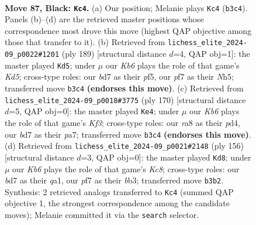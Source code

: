 \documentclass[11pt]{article}
\begin{document}
\clearpage

\begin{figure}[p]\centering
\begin{subfigure}{0.46\textwidth}\centering
\resizebox{\linewidth}{!}{%
\newchessgame
\chessboard[
  setfen={R7/3B1P2/8/7P/8/1k6/8/7K b - - 6 87},
  showmover=false,
  pgfstyle=straightmove, color=movearrow, markmove={b3-c4}
]}
\caption{}
\end{subfigure}\hfill
\begin{subfigure}{0.46\textwidth}\centering
\resizebox{\linewidth}{!}{%
\newchessgame
\chessboard[
  setfen={4R3/8/8/K4P1n/3k4/8/8/8 b - - 0 95},
  showmover=false,
  pgfstyle=straightmove, color=movearrow, markmove={d4-d5}
]}
\caption{}
\end{subfigure}
\\[4pt]
\begin{subfigure}{0.46\textwidth}\centering
\resizebox{\linewidth}{!}{%
\newchessgame
\chessboard[
  setfen={8/p7/8/6k1/3p4/P4K2/8/8 w - - 0 86},
  showmover=false,
  pgfstyle=straightmove, color=movearrow, markmove={f3-e4}
]}
\caption{}
\end{subfigure}\hfill
\begin{subfigure}{0.46\textwidth}\centering
\resizebox{\linewidth}{!}{%
\newchessgame
\chessboard[
  setfen={2K5/8/2k5/8/5p1p/1b6/8/q7 w - - 0 79},
  showmover=false,
  pgfstyle=straightmove, color=movearrow, markmove={c8-d8}
]}
\caption{}
\end{subfigure}
\caption{\textbf{Move 87, Black: \texttt{Kc4}.} (a) Our position; Melanie plays \texttt{Kc4} (\texttt{b3c4}). Panels (b)--(d) are the retrieved master positions whose correspondence most drove this move (highest QAP objective among those that transfer to it). (b) Retrieved from \texttt{lichess\_elite\_2024-09\_p0022\#1201} (ply 189) [structural distance $d$=4, QAP obj=1]: the master played \texttt{Kd5}; under $\mu$ our \emph{Kb6} plays the role of that game's \emph{Kd5}; cross-type roles: our \emph{b}d7 as their \emph{p}f5, our \emph{p}f7 as their \emph{N}h5; transferred move \texttt{b3c4} \textbf{(endorses this move)}. (c) Retrieved from \texttt{lichess\_elite\_2024-09\_p0018\#3775} (ply 170) [structural distance $d$=5, QAP obj=0]: the master played \texttt{Ke4}; under $\mu$ our \emph{Kb6} plays the role of that game's \emph{Kf3}; cross-type roles: our \emph{r}a8 as their \emph{p}d4, our \emph{b}d7 as their \emph{p}a7; transferred move \texttt{b3c4} \textbf{(endorses this move)}. (d) Retrieved from \texttt{lichess\_elite\_2024-09\_p0021\#2148} (ply 156) [structural distance $d$=3, QAP obj=0]: the master played \texttt{Kd8}; under $\mu$ our \emph{Kb6} plays the role of that game's \emph{Kc8}; cross-type roles: our \emph{b}d7 as their \emph{q}a1, our \emph{p}f7 as their \emph{b}b3; transferred move \texttt{b3b2}. Synthesis: 2 retrieved analogs transferred to \texttt{Kc4} (summed QAP objective 1, the strongest correspondence among the candidate moves); Melanie committed it via the \texttt{search} selector.}
\label{fig:thought-m173}
\end{figure}
\end{document}
